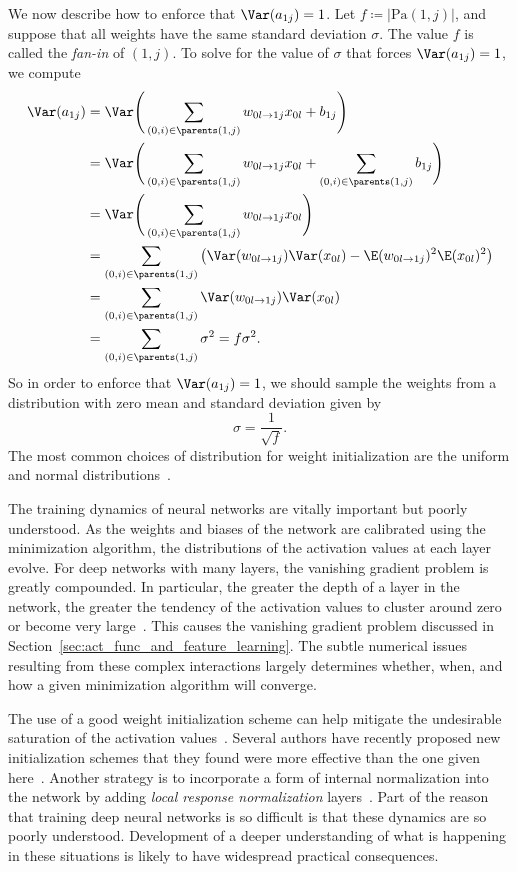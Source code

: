 \documentclass[11pt,a4paper]{article}
\numberwithin{equation}{section}
\newcommand{\weight}[2]{w_{#1 \rightarrow #2}}
\begin{document}
We now describe how to enforce that $\Var(a_{1j}) = 1$. Let $f \coloneqq
|\text{Pa}(1, j)|$, and suppose that all weights have the same standard
deviation $\sigma$. The value $f$ is called the \emph{fan-in} of $(1, j)$. To
solve for the value of $\sigma$ that forces $\Var(a_{1j}) = 1$, we compute
\begin{align*}
	\Var(a_{1j})
	&= \Var\Bigg(\sum_{(0, i) \in \parents(1, j)} \weight{0l}{1j} x_{0l} + b_{1j}\Bigg) \\
	&= \Var\Bigg(
		\sum_{(0, i) \in \parents(1, j)} \weight{0l}{1j} x_{0l} +
		\sum_{(0, i) \in \parents(1, j)} b_{1j}
	\Bigg) \\
	&= \Var\Bigg(\sum_{(0, i) \in \parents(1, j)} \weight{0l}{1j} x_{0l}\Bigg)\\
	&= \sum_{(0, i) \in \parents(1, j)} \left(
		\Var(\weight{0l}{1j}) \Var(x_{0l}) -
		\E(\weight{0l}{1j})^2 \E(x_{0l})^2
	\right) \\
	&= \sum_{(0, i) \in \parents(1, j)} \Var(\weight{0l}{1j}) \Var(x_{0l}) \\
	&= \sum_{(0, i) \in \parents(1, j)} \sigma^2 = f \sigma^2.
\end{align*}
So in order to enforce that $\Var(a_{1j}) = 1$, we should sample the weights
from a distribution with zero mean and standard deviation given by
\[
	\sigma = \frac{1}{\sqrt{f}}.
\]
The most common choices of distribution for weight initialization are the
uniform and normal distributions~\citep{lecun-98b, krizhevsky2012imagenet}.

The training dynamics of neural networks are vitally important but poorly
understood. As the weights and biases of the network are calibrated using the
minimization algorithm, the distributions of the activation values at each layer
evolve. For deep networks with many layers, the vanishing gradient problem is
greatly compounded. In particular, the greater the depth of a layer in the
network, the greater the tendency of the activation values to cluster around
zero or become very large~\citep{glorot2010understanding}. This causes the
vanishing gradient problem discussed in
Section~\ref{sec:act_func_and_feature_learning}. The subtle numerical issues
resulting from these complex interactions largely determines whether, when, and
how a given minimization algorithm will converge.

The use of a good weight initialization scheme can help mitigate the undesirable
saturation of the activation values~\citep{glorot2010understanding}. Several
authors have recently proposed new initialization schemes that they found were
more effective than the one given here~\citep{glorot2010understanding,
martens2010deep}. Another strategy is to incorporate a form of internal
normalization into the network by adding \emph{local response normalization}
layers~\citep{krizhevsky2012imagenet}. Part of the reason that training deep
neural networks is so difficult is that these dynamics are so poorly understood.
Development of a deeper understanding of what is happening in these situations
is likely to have widespread practical consequences.
\end{document}

